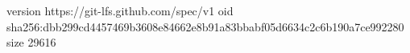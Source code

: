 version https://git-lfs.github.com/spec/v1
oid sha256:dbb299cd4457469b3608e84662e8b91a83bbabf05d6634c2c6b190a7ce992280
size 29616
